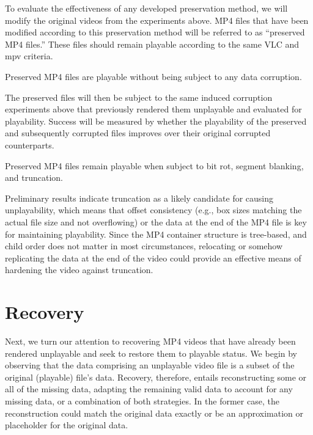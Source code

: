 To evaluate the effectiveness of any developed preservation method, we will modify the original videos from the experiments above. MP4 files that have been modified according to this preservation method will be referred to as ``preserved MP4 files.'' These files should remain playable according to the same VLC and mpv criteria.

\begin{hypothesis}
    \label{hyp:preserved-default-playable}
    Preserved MP4 files are playable without being subject to any data corruption.
\end{hypothesis}

The preserved files will then be subject to the same induced corruption experiments above that previously rendered them unplayable and evaluated for playability. Success will be measured by whether the playability of the preserved and subsequently corrupted files improves over their original corrupted counterparts.

\begin{hypothesis}
    \label{hyp:preserved-corrupted-playable}
    Preserved MP4 files remain playable when subject to bit rot, segment blanking, and truncation.
\end{hypothesis}

Preliminary results indicate truncation as a likely candidate for causing unplayability, which means that offset consistency (e.g., box sizes matching the actual file size and not overflowing) or the data at the end of the MP4 file is key for maintaining playability. Since the MP4 container structure is tree-based, and child order does not matter in most circumstances, relocating or somehow replicating the data at the end of the video could provide an effective means of hardening the video against truncation.

\section{Recovery}

Next, we turn our attention to recovering MP4 videos that have already been rendered unplayable and seek to restore them to playable status. We begin by observing that the data comprising an unplayable video file is a subset of the original (playable) file's data. Recovery, therefore, entails reconstructing some or all of the missing data, adapting the remaining valid data to account for any missing data, or a combination of both strategies. In the former case, the reconstruction could match the original data exactly or be an approximation or placeholder for the original data.

